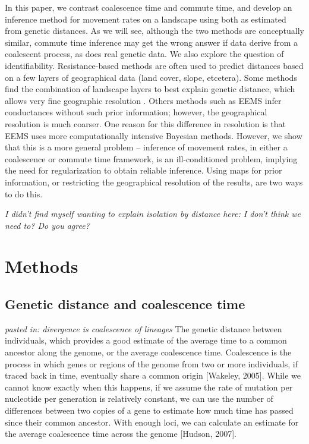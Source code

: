 \documentclass{article}
\newcommand{\plr}[1]{{\em \color{blue} #1}}
\begin{document}
In this paper, we contrast 
coalescence time and commute time,
and develop an inference method for movement rates on a landscape
using both as estimated from genetic distances.
As we will see,
although the two methods are conceptually similar,
commute time inference may get the wrong answer if data derive from a coalescent process,
as does real genetic data.
We also explore the question of identifiability.
Resistance-based methods are often used to predict distances based on a few layers of geographical data
(land cover, slope, etcetera).
Some methods find the combination of landscape layers to best explain genetic distance,
which allows very fine geographic resolution \citep{infer_resistance}.
Others methods such as EEMS \citep{eems} infer conductances without such prior information;
however, the geographical resolution is much coarser.
One reason for this difference in resolution
is that EEMS uses more computationally intensive Bayesian methods.
However, we show that this is a more general problem --
inference of movement rates, in either a coalescence or commute time framework,
is an ill-conditioned problem,
implying the need for regularization to obtain reliable inference.
Using maps for prior information, or restricting the geographical resolution of the results,
are two ways to do this.

\plr{I didn't find myself wanting to explain isolation by distance here:
    I don't think we need to? Do you agree?}

\section*{Methods}

\subsection*{Genetic distance and coalescence time}

\plr{pasted in: divergence is coalescence of lineages}
The genetic distance between
individuals, which provides a good estimate of the average time to a common ancestor along the genome, or
the average coalescence time. Coalescence is the process in which genes or regions of the genome from two
or more individuals, if traced back in time, eventually share a common origin [Wakeley, 2005]. While we
cannot know exactly when this happens, if we assume the rate of mutation per nucleotide per generation is
relatively constant, we can use the number of differences between two copies of a gene to estimate how much
time has passed since their common ancestor. With enough loci, we can calculate an estimate for
the average coalescence time across the genome [Hudson, 2007].
\end{document}
